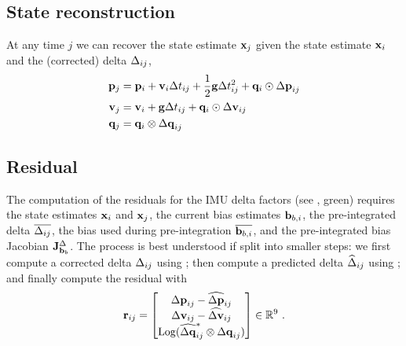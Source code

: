 \subsection{State reconstruction}

At any time $j$ we can recover the state estimate ${\bf x}_j$ given the state estimate ${\bf x}_i$ and the (corrected) delta $\Delta_{ij}$,
%
\begin{align} \label{equ:reconstruction}
\begin{split}
{\bf p}_j &= {\bf p}_i + {\bf v}_i\Delta t_{ij} + \frac12{\bf g}\Delta t_{ij}^2 + {\bf q}_i\odot{\Delta{\bf p}}_{ij} \\
{\bf v}_j &= {\bf v}_i + {\bf g}\Delta t_{ij} + {\bf q}_i\odot{\Delta{\bf v}}_{ij} \\
{\bf q}_j &= {\bf q}_i\otimes{\Delta{\bf q}}_{ij}   
\end{split}
\end{align}



\subsection{Residual}

The computation of the residuals for the IMU delta factors (see , green) requires the state estimates ${\bf x}_i$ and ${\bf x}_j$, the current bias estimates ${\bf b}_{b,i}$, the pre-integrated delta $\overline{\Delta_{ij}}$, the bias used during pre-integration $\overline{{\bf b}_{b,i}}$, and the pre-integrated bias Jacobian ${{\bf J}^{\Delta}_{{\bf b}_b}}$. The process is best understood if split into smaller steps: we first compute a corrected delta $\Delta_{ij}$ using ; then compute a predicted delta $\widehat{\Delta}_{ij}$ using ; and finally compute the residual with
%
\begin{align}
{\bf r}_{ij} 
= \begin{bmatrix}
{\Delta{\bf p}}_{ij}-\widehat{{\Delta{\bf p}}}_{ij} \\
{\Delta{\bf v}}_{ij}-\widehat{{\Delta{\bf v}}}_{ij} \\
\operatorname*{Log}(\widehat{{\Delta{\bf q}}}_{ij}^*\otimes{\Delta{\bf q}}_{ij})
\end{bmatrix} 
\in {\mathbb R}^9
~.
\end{align}




